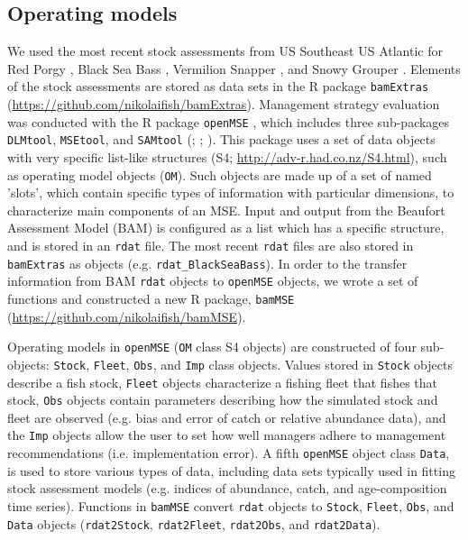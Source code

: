 \documentclass[12pt,english]{article}
\begin{document}
\begin{flushleft}
\begin{spacing}{1.9}
\subsection*{Operating models}
We used the most recent stock assessments from US Southeast US Atlantic for Red Porgy \citep{SEDAR60}, Black Sea Bass \citep{SEDAR56}, Vermilion Snapper \citep{SEDAR55}, and Snowy Grouper \citep{SEDAR36Update}. Elements of the stock assessments are stored as data sets in the R package \texttt{bamExtras} (\url{https://github.com/nikolaifish/bamExtras}). Management strategy evaluation was conducted with the R package \texttt{openMSE} \citep{openMSE}, which includes three sub-packages \texttt{DLMtool}, \texttt{MSEtool}, and \texttt{SAMtool} (\citealt{DLMtool}; \citealt{MSEtool}; \citealt{SAMtool}). This package uses a set of data objects with very specific list-like structures (S4; \url{http://adv-r.had.co.nz/S4.html}), such as operating model objects (\texttt{OM}). Such objects are made up of a set of named 'slots', which contain specific types of information with particular dimensions, to characterize main components of an MSE. Input and output from the Beaufort Assessment Model (BAM) is configured as a list which has a specific structure, and is stored in an \texttt{rdat} file. The most recent \texttt{rdat} files are also stored in \texttt{bamExtras} as objects (e.g. \texttt{rdat\_BlackSeaBass}). In order to the transfer information from BAM \texttt{rdat} objects to \texttt{openMSE} objects, we wrote a set of functions and constructed a new R package, \texttt{bamMSE} (\url{https://github.com/nikolaifish/bamMSE}).

Operating models in \texttt{openMSE} (\texttt{OM} class S4 objects) are constructed of four sub-objects: \texttt{Stock}, \texttt{Fleet}, \texttt{Obs}, and \texttt{Imp} class objects. Values stored in \texttt{Stock} objects describe a fish stock, \texttt{Fleet} objects characterize a fishing fleet that fishes that stock, \texttt{Obs} objects contain parameters describing how the simulated stock and fleet are observed (e.g. bias and error of catch or relative abundance data), and the \texttt{Imp} objects allow the user to set how well managers adhere to management recommendations (i.e. implementation error). A fifth \texttt{openMSE} object class \texttt{Data}, is used to store various types of data, including data sets typically used in fitting stock assessment models (e.g. indices of abundance, catch, and age-composition time series). Functions in \texttt{bamMSE} convert \texttt{rdat} objects to \texttt{Stock}, \texttt{Fleet}, \texttt{Obs}, and \texttt{Data} objects (\texttt{rdat2Stock}, \texttt{rdat2Fleet}, \texttt{rdat2Obs}, and \texttt{rdat2Data}).


\end{spacing}
\end{flushleft}
\end{document}
